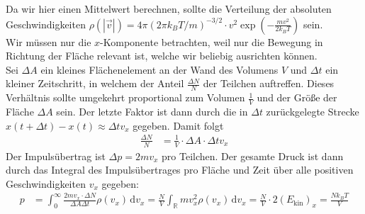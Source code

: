 \documentclass[a4paper,12pt]{article}
\newcommand{\intx}{}
\newcommand{\kla}{}
\newcommand{\tecxt}{}
\begin{document}
Da wir hier einen Mittelwert berechnen, sollte die Verteilung der absoluten Geschwindigkeiten $\rho(|\vec{v}|)=4\pi (2\pi k_BT/m)^{-3/2}\cdot v^2\exp\kla\left( {-\frac{mv^2}{2k_BT}} \right)$ sein.\\
Wir müssen nur die $x$-Komponente betrachten, weil nur die Bewegung in Richtung der Fläche relevant ist, welche wir beliebig ausrichten können.\\
Sei $\Delta A$ ein kleines Flächenelement an der Wand des Volumens $V$ und $\Delta t$ ein kleiner Zeitschritt, in welchem der Anteil $\frac{\Delta N}{N}$ der Teilchen auftreffen. Dieses Verhältnis sollte umgekehrt proportional zum Volumen $\frac{1}{V}$ und der Größe der Fläche $\Delta A$ sein. Der letzte Faktor ist dann durch die in $\Delta t$ zurückgelegte Strecke $x(t+\Delta t)-x(t)\approx\Delta tv_x$ gegeben. Damit folgt
\begin{align*}
\frac{\Delta N}{N}&=\frac{1}{V}\cdot\Delta A\cdot\Delta t v_x
\end{align*}
Der Impulsübertrag ist $\Delta p=2mv_x$ pro Teilchen. Der gesamte Druck ist dann durch das Integral des Impulsübertrages pro Fläche und Zeit über alle positiven Geschwindigkeiten $v_x$ gegeben:
\begin{align*}
p&=\intx\int_{0}^{\infty}\frac{2mv_x\cdot\Delta N}{\Delta A\Delta t}\rho(v_x)\,\mathrm{d}v_x=\frac{N}{V}\intx\int_{\mathbb{R}}mv_x^2\rho(v_x)\,\mathrm{d}v_x=\frac{N}{V}\cdot 2(E_\tecxt\text{kin})_x=\frac{Nk_BT}{V}
\end{align*} 
\end{document}
